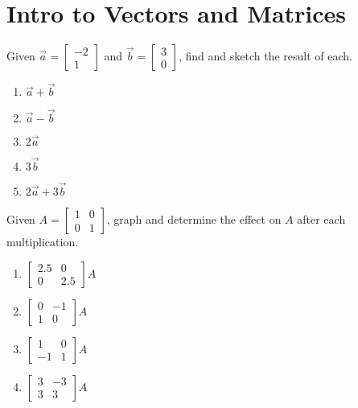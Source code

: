 \chapter{Intro to Vectors and Matrices}

Given $\vec{a} = \begin{bmatrix} -2 \\ 1 \end{bmatrix}$ and $\vec{b} = \begin{bmatrix} 3 \\ 0 \end{bmatrix}$, find and sketch the result of each.

\begin{multicols}{5}
\begin{enumerate}
	\item $\vec{a} + \vec{b}$
	\item $\vec{a} - \vec{b}$
	\item $2\vec{a}$
	\item $3\vec{b} $
	\item $2\vec{a} + 3\vec{b}$
\end{enumerate}	\setcounter{Review}{\value{enumi}}
\end{multicols}

Given $A = \begin{bmatrix} 1 & 0 \\ 0 & 1 \end{bmatrix}$, graph and determine the effect on $A$ after each multiplication.

\begin{multicols}{4}
\begin{enumerate}	\setcounter{enumi}{\value{Review}}
	\item $\begin{bmatrix} 2.5 & 0 \\ 0 & 2.5 \end{bmatrix} A$
	\item $\begin{bmatrix} 0 & -1 \\ 1 & 0 \end{bmatrix} A$
	\item $\begin{bmatrix} 1 & 0 \\ -1 & 1 \end{bmatrix} A$
	\item $\begin{bmatrix} 3 & -3 \\ 3 & 3 \end{bmatrix} A$
\end{enumerate}	\setcounter{Review}{\value{enumi}}
\end{multicols}


